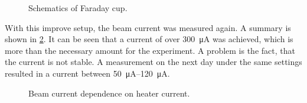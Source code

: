 \begin{figure}[h]
	\centering
	\begin{tikzpicture}
		
	\end{tikzpicture}
	
	\caption{Schematics of Faraday cup.}
	\label{fig:Schematics of Faraday cup}
\end{figure}

With this improve setup, the beam current was measured again. A summary is shown in \cref{fig:Beam current dependence on heater current}. It can be seen that a current of over \SI{300}{\micro\ampere} was achieved, which is more than the necessary amount for the experiment. A problem is the fact, that the current is not stable. A measurement on the next day under the same settings resulted in a current between \SIrange{50}{120}{\micro\ampere}.


\begin{figure}[h]
	\centering
	\begin{tikzpicture}
		
	\end{tikzpicture}
	
	\caption{Beam current dependence on heater current.}
	\label{fig:Beam current dependence on heater current}
\end{figure}
